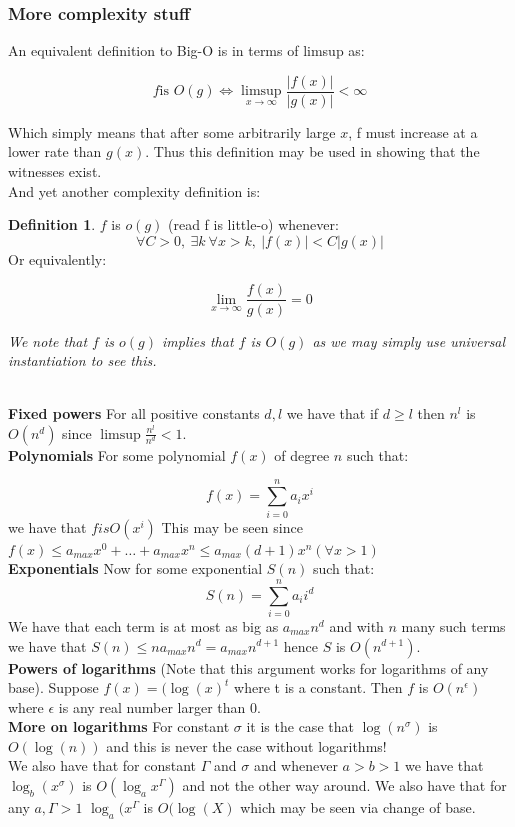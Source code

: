 \documentclass[titlepage]{article}
\theoremstyle{definition}
\newtheorem{definition}{Definition}
\numberwithin{equation}{subsection}
\numberwithin{remark}{subsection}
\begin{document}
\subsubsection{More complexity stuff}
An equivalent definition to Big-O is in terms of limsup as:

$$ f \text{is }O(g) \iff \limsup_{x\to\infty}{\frac{|f(x)|}{|g(x)|}} < \infty  $$

Which simply means that after some arbitrarily large $x$, f must increase at a lower rate than $g(x)$. Thus this definition may be used in showing that the witnesses exist. 
\\
And yet another complexity definition is:
\begin{definition}
$f$ is $o(g)$ (read f is little-o) whenever:
$$ \forall C > 0, \ \exists k \ \forall x>k, \ |f(x)| < C|g(x)|$$ Or equivalently:

$$ \lim_{x\to\infty}\frac{f(x)}{g(x)} = 0$$

\textit{We note that $f$ is $o(g)$ implies that $f$ is $O(g)$ as we may simply use universal instantiation to see this.}
\end{definition}
\\
\textbf{Fixed powers} For all positive constants $d,l$ we have that if $d \geq l$ then $n^l$ is $O(n^d)$ since $\limsup{\frac{n^l}{n^d}} < 1$.
\\

\textbf{Polynomials} For some polynomial $f(x)$ of degree $n$ such that:

$$ f(x) = \sum_{i=0}^{n}a_{i}x^{i}$$ we have that $f is O(x^{i})$ This may be seen since $f(x) \leq a_{max}x^{0} + \ldots + a_{max}x^{n} \leq a_{max}(d+1)x^{n} (\forall x > 1)$
\\

\textbf{Exponentials} Now for some exponential $S(n)$ such that: $$ S(n) = \sum_{i=0}^{n}a_{i}i^{d} $$
We have that each term is at most as big as $a_{max}n^{d}$ and with $n$ many such terms we have that $S(n) \leq na_{max}n^{d} = a_{max}n^{d+1}$ hence $S$ is $O(n^{d+1})$.
\\

\textbf{Powers of logarithms} (Note that this argument works for logarithms of any base). Suppose $f(x) = (\log(x)^t$ where t is a constant. Then $f$ is $O(n^{\epsilon})$ where $\epsilon$ is any real number larger than 0. 
\\
\textbf{More on logarithms} For constant $\sigma$ it is the case that $\log(n^\sigma)$ is $O(\log(n))$ and this is never the case without logarithms!
\\
We also have that for constant $\Gamma$ and $\sigma$ and whenever $a>b>1$ we have that $\log_{b}(x^{\sigma})$ is $O(\log_{a}x^{\Gamma})$ and not the other way around. We also have that for any $a,\Gamma > 1$ $\log_{a}(x^{\Gamma}$ is $O(\log(X)$ which may be seen via change of base. 
\\
\end{document}

